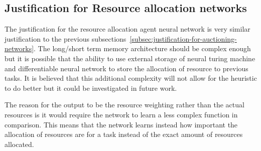 \subsection{Justification for Resource allocation networks}\label{subsec:justification-for-resource-allocation-networks}
The justification for the resource allocation agent neural network is very similar justification to the previous
subsections~\ref{subsec:justification-for-auctioning-networks}. The long/short term memory architecture should be
complex enough but it is possible that the ability to use external storage of neural turing machine and differentiable
neural network to store the allocation of resource to previous tasks. It is believed that this additional complexity
will not allow for the heuristic to do better but it could be investigated in future work.

The reason for the output to be the resource weighting rather than the actual resources is it would require the network
to learn a less complex function in comparison. This means that the network learns instead how important the allocation
of resources are for a task instead of the exact amount of resources allocated.
